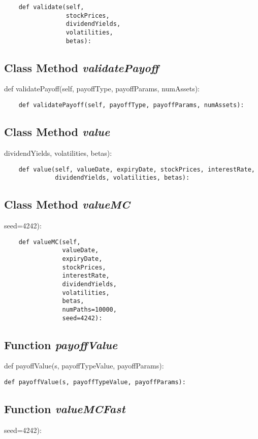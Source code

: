 \documentclass[twoside,11pt]{book}
\begin{document}
\begin{lstlisting}
    def validate(self,
                 stockPrices,
                 dividendYields,
                 volatilities,
                 betas):
\end{lstlisting}

\subsection{Class Method {\it validatePayoff}}
def validatePayoff(self, payoffType, payoffParams, numAssets):

\begin{lstlisting}
    def validatePayoff(self, payoffType, payoffParams, numAssets):
\end{lstlisting}

\subsection{Class Method {\it value}}
dividendYields, volatilities, betas):

\begin{lstlisting}
    def value(self, valueDate, expiryDate, stockPrices, interestRate,
              dividendYields, volatilities, betas):
\end{lstlisting}

\subsection{Class Method {\it valueMC}}
seed=4242):

\begin{lstlisting}
    def valueMC(self,
                valueDate,
                expiryDate,
                stockPrices,
                interestRate,
                dividendYields,
                volatilities,
                betas,
                numPaths=10000,
                seed=4242):
\end{lstlisting}

\subsection{Function {\it payoffValue}}
def payoffValue(s, payoffTypeValue, payoffParams):

\begin{lstlisting}
def payoffValue(s, payoffTypeValue, payoffParams):
\end{lstlisting}

\subsection{Function {\it valueMCFast}}
seed=4242):
\end{document}
